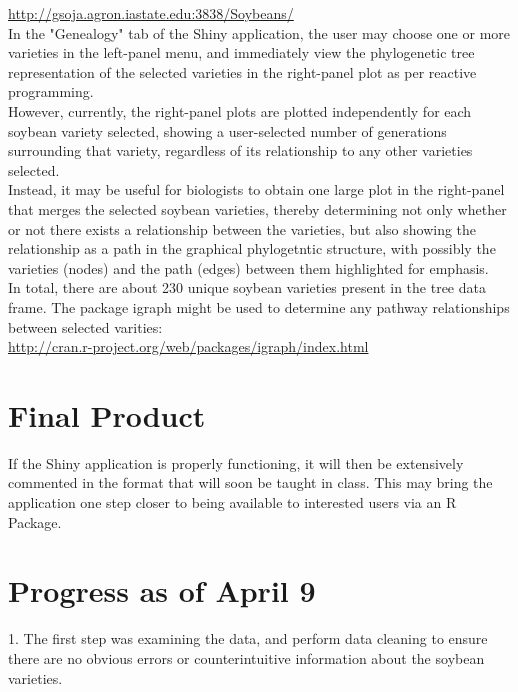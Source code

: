 \documentclass{article}\usepackage[]{graphicx}\usepackage[]{color}
\begin{document}
\hyperref[shinySBLink]{http://gsoja.agron.iastate.edu:3838/Soybeans/}\\

\noindent
In the "Genealogy" tab of the Shiny application, the user may choose one or more varieties in the left-panel menu, and immediately view the phylogenetic tree representation of the selected varieties in the right-panel plot as per reactive programming.\\

However, currently, the right-panel plots are plotted independently for each soybean variety selected, showing a user-selected number of generations surrounding that variety, regardless of its relationship to any other varieties selected.\\

Instead, it may be useful for biologists to obtain one large plot in the right-panel that merges the selected soybean varieties, thereby determining not only whether or not there exists a relationship between the varieties, but also showing the relationship as a path in the graphical phylogetntic structure, with possibly the varieties (nodes) and the path (edges) between them highlighted for emphasis.\\

In total, there are about 230 unique soybean varieties present in the tree data frame. The package igraph might be used to determine any pathway relationships between selected varities:\\

\hyperref[igraphLink]{http://cran.r-project.org/web/packages/igraph/index.html}\\

\noindent

\section*{Final Product}

If the Shiny application is properly functioning, it will then be extensively commented in the format that will soon be taught in class. This may bring the application one step closer to being available to interested users via an R Package.

\section*{Progress as of April 9}

1. The first step was examining the data, and perform data cleaning to ensure there are no obvious errors or counterintuitive information about the soybean varieties.
\end{document}
